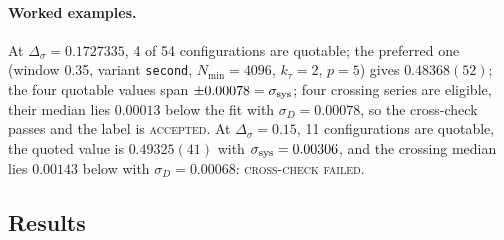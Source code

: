 \documentclass[10pt,a4paper]{article}
\newcommand{\Ds}{\Delta_\sigma}
\newcommand{\code}[1]{\texttt{#1}}
\newcommand{\lbl}[1]{{\mdseries\scshape #1}}
\newcommand{\ssys}{\sigma_{\rm sys}}
\newcommand{\ktau}{k_\tau}
\begin{document}
\paragraph{Worked examples.} At $\Ds=0.1727335$, 4 of 54 configurations are quotable; the preferred one (window 0.35, variant \code{second},
$N_{\min}=4096$, $\ktau=2$, $p=5$) gives $0.48368(52)$; the four quotable values span $\pm0.00078=\ssys$; four crossing series are eligible,
their median lies $0.00013$ below the fit with $\sigma_D=0.00078$, so the cross-check passes and the label is \lbl{accepted}. At $\Ds=0.15$,
11 configurations are quotable, the quoted value is $0.49325(41)$ with $\ssys=0.00306$, and the crossing median lies $0.00143$ below with
$\sigma_D=0.00068$: \lbl{cross-check failed}.

\subsection{Results}
\end{document}
